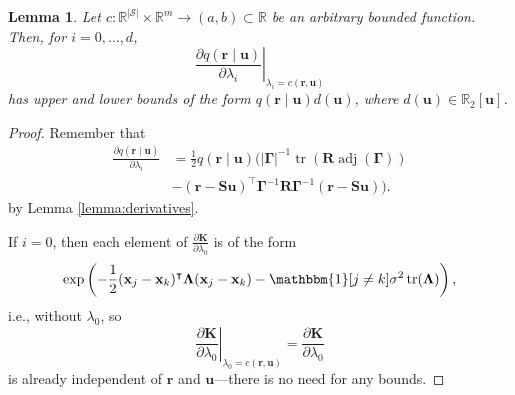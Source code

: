 \documentclass{mpaper}
\newtheorem{lemma}[theorem]{Lemma}
\DeclareMathOperator{\adj}{adj}
\DeclareMathOperator{\tr}{tr}
\begin{document}
\begin{lemma} \label{lemma:bound1}
  Let $c : \mathbb{R}^{|\mathcal{S}|} \times \mathbb{R}^m \to (a, b) \subset
  \mathbb{R}$ be an arbitrary bounded function. Then, for $i = 0,
  \dots, d$,
  \[
    \left. \frac{\partial q(\mathbf{r} \mid \mathbf{u})}{\partial \lambda_i} \right|_{\lambda_i
      = c(\mathbf{r}, \mathbf{u})}
  \]
  has upper and lower bounds of the form $q(\mathbf{r} \mid \mathbf{u})d(\mathbf{u})$, where
  $d(\mathbf{u}) \in \mathbb{R}_2[\mathbf{u}]$.
\end{lemma}
\begin{proof}
  Remember that
  \begin{align*}
    \frac{\partial q(\mathbf{r} \mid \mathbf{u})}{\partial \lambda_i} &= \frac{1}{2}q(\mathbf{r} \mid \mathbf{u}) (|\bm\Gamma|^{-1} \tr(\mathbf{R} \adj(\bm\Gamma)) \\
                                                                      &- (\mathbf{r} - \mathbf{Su})^\intercal\bm\Gamma^{-1}\mathbf{R}\bm\Gamma^{-1}(\mathbf{r} - \mathbf{Su})).
  \end{align*}
  by Lemma \ref{lemma:derivatives}.


  If $i = 0$, then each element of $\frac{\partial \mathbf{K}}{\partial
    \lambda_0}$ is of the form
  \[
    \exp \left( -\frac{1}{2}(\mathbf{x}_j - \mathbf{x}_k)^\intercal
      \bm\Lambda (\mathbf{x}_j - \mathbf{x}_k) - \mathbbm{1}[j \ne
      k]\sigma^2\tr(\bm\Lambda) \right),
  \]
  i.e., without $\lambda_0$, so
  \[
    \left. \frac{\partial \mathbf{K}}{\partial \lambda_0} \right|_{\lambda_0 =
      c(\mathbf{r}, \mathbf{u})} = \frac{\partial \mathbf{K}}{\partial
      \lambda_0}
  \]
  is already independent of $\mathbf{r}$ and $\mathbf{u}$---there is no need
  for any bounds.


\end{proof}
\end{document}
